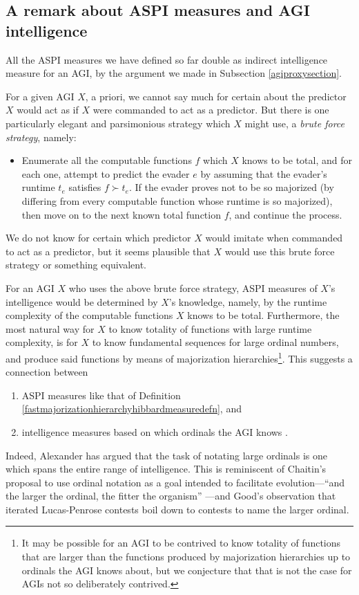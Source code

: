 \documentclass{article}
\begin{document}
\subsection{A remark about ASPI measures and AGI intelligence}

All the ASPI measures we have defined so far double as indirect intelligence
measure for an AGI, by the argument we made in Subsection \ref{agiproxysection}.

For a given AGI $X$, a priori, we cannot say much for certain about the predictor $X$
would act as if $X$ were commanded to act as a predictor. But there is one particularly
elegant and parsimonious strategy which $X$ might use, a \emph{brute force strategy},
namely:
\begin{itemize}
    \item Enumerate all the
    computable functions $f$ which $X$ knows to be total, and for each one, attempt to
    predict the evader $e$ by assuming that the evader's runtime $t_e$
    satisfies $f\succ t_e$.
    If the evader proves not to be so majorized (by differing from every computable
    function whose runtime is so majorized), then move on to the next
    known total function $f$, and continue the process.
\end{itemize}
We do not
know for certain which predictor $X$ would imitate when commanded to act as a predictor,
but it seems plausible that $X$ would use this brute force strategy or something
equivalent.

For an AGI $X$ who uses the above brute force strategy, ASPI
measures of $X$'s intelligence would be determined by $X$'s knowledge, namely,
by the runtime complexity of the computable functions $X$ knows to be total.
Furthermore, the most natural way for $X$ to know totality of functions with large
runtime complexity, is for $X$ to know fundamental sequences for large ordinal
numbers, and produce said functions by means of majorization
hierarchies\footnote{It may be
possible for an AGI to be contrived to know totality of functions that are larger
than the functions produced by majorization hierarchies up to ordinals the AGI knows
about, but we conjecture that that is not the case for AGIs not so deliberately
contrived.}. This suggests a connection between
\begin{enumerate}
    \item
    ASPI measures like that of
    Definition \ref{fastmajorizationhierarchyhibbardmeasuredefn}, and
    \item
    intelligence measures based on which ordinals the AGI knows
    \cite{ioi1}.
\end{enumerate}
Indeed, Alexander has argued \cite{ioi2} that
the task of notating large ordinals is one which
spans the entire range of intelligence.
This is reminiscent of Chaitin's proposal to use ordinal notation
as a goal intended to facilitate evolution---``and the larger the ordinal,
the fitter the organism'' \cite{chaitin}---and Good's observation
\cite{good1969godel} that iterated Lucas-Penrose contests boil down to
contests to name the larger ordinal.
\end{document}
